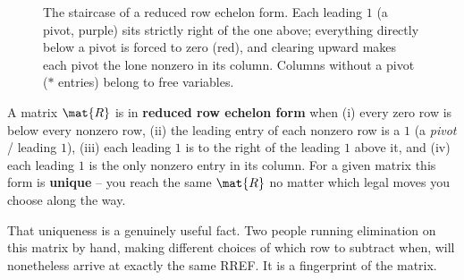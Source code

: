 \begin{figure}[H]
\centering
{}
\caption{The staircase of a reduced row echelon form. Each leading $1$ (a pivot,
purple) sits strictly right of the one above; everything directly below a pivot
is forced to zero (red), and clearing upward makes each pivot the lone nonzero in
its column. Columns without a pivot ($*$ entries) belong to free variables.}
\label{ch07:rref-staircase}
\end{figure}

\begin{formalbox}
A matrix $\mat{R}$ is in \textbf{reduced row echelon form} when (i) every zero
row is below every nonzero row, (ii) the leading entry of each nonzero row is a
$1$ (a \emph{pivot} / leading $1$), (iii) each leading $1$ is to the right of the
leading $1$ above it, and (iv) each leading $1$ is the only nonzero entry in its
column. For a given matrix this form is \textbf{unique} -- you reach the same
$\mat{R}$ no matter which legal moves you choose along the way.
\end{formalbox}

That uniqueness is a genuinely useful fact. Two people running elimination on this
matrix by hand, making different choices of which row to subtract when, will nonetheless
arrive at exactly the same RREF. It is a fingerprint of the matrix.

